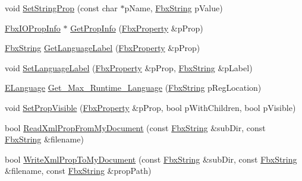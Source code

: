\begin{DoxyCompactItemize}
void \hyperlink{class_fbx_i_o_settings_aadffc404d2cfc79ee842265c46abbc12}{Set\+String\+Prop} (const char $\ast$p\+Name, \hyperlink{class_fbx_string}{Fbx\+String} p\+Value)
\item 
\hyperlink{class_fbx_i_o_prop_info}{Fbx\+I\+O\+Prop\+Info} $\ast$ \hyperlink{class_fbx_i_o_settings_a04310e1fd32d0f8852eef9dae52aab54}{Get\+Prop\+Info} (\hyperlink{class_fbx_property}{Fbx\+Property} \&p\+Prop)
\item 
\hyperlink{class_fbx_string}{Fbx\+String} \hyperlink{class_fbx_i_o_settings_a2588777e1bbeed1602e2538fa47cd986}{Get\+Language\+Label} (\hyperlink{class_fbx_property}{Fbx\+Property} \&p\+Prop)
\item 
void \hyperlink{class_fbx_i_o_settings_ac2fc08a0a553a6fc6c4e5e9891b6ad38}{Set\+Language\+Label} (\hyperlink{class_fbx_property}{Fbx\+Property} \&p\+Prop, \hyperlink{class_fbx_string}{Fbx\+String} \&p\+Label)
\item 
\hyperlink{class_fbx_i_o_settings_a84f2effd8e41c382faa5ca58046f323f}{E\+Language} \hyperlink{class_fbx_i_o_settings_a253fc042fe3d373a9e1c369ac2d2bd27}{Get\+\_\+\+Max\+\_\+\+Runtime\+\_\+\+Language} (\hyperlink{class_fbx_string}{Fbx\+String} p\+Reg\+Location)
\item 
void \hyperlink{class_fbx_i_o_settings_a23c19390ac805e94866ae738953bb479}{Set\+Prop\+Visible} (\hyperlink{class_fbx_property}{Fbx\+Property} \&p\+Prop, bool p\+With\+Children, bool p\+Visible)
\item 
bool \hyperlink{class_fbx_i_o_settings_a843dcbf01c90245e4bfc08effe999acc}{Read\+Xml\+Prop\+From\+My\+Document} (const \hyperlink{class_fbx_string}{Fbx\+String} \&sub\+Dir, const \hyperlink{class_fbx_string}{Fbx\+String} \&filename)
\item 
bool \hyperlink{class_fbx_i_o_settings_a7cdebdeff147dbdb99faaadc874e5d69}{Write\+Xml\+Prop\+To\+My\+Document} (const \hyperlink{class_fbx_string}{Fbx\+String} \&sub\+Dir, const \hyperlink{class_fbx_string}{Fbx\+String} \&filename, const \hyperlink{class_fbx_string}{Fbx\+String} \&prop\+Path)
\end{DoxyCompactItemize}
